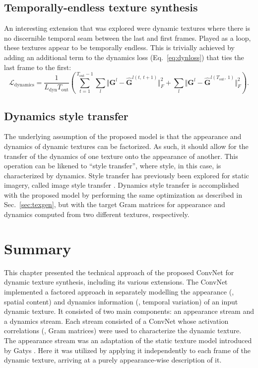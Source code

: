 {

\subsection{Temporally-endless texture synthesis}\label{sec:temporally_endless_synthesis}

An interesting extension that was explored were dynamic textures where there is no discernible temporal seam between the last and first frames. Played as a loop, these textures appear to be temporally endless. This is trivially achieved by adding an additional term to the dynamics loss (Eq.\ \ref{eq:dynloss}) that ties the last frame to the first:
\begin{equation}
	\mathcal{L}_\text{dynamics} = \frac{1}{L_\text{dyn} T_\text{out}}\left(\sum_{t=1}^{T_\text{out}-1} \sum_{l}  \Vert \mathbf{G}^l - \hat{\mathbf{G}}^{l(t,\ t+1)}\Vert^2_F + \sum_{l}  \Vert \mathbf{G}^l - \hat{\mathbf{G}}^{l(T_\text{out},\ 1)}\Vert^2_F\right).
\end{equation}

\subsection{Dynamics style transfer}

The underlying assumption of the proposed model is that the appearance
and dynamics of dynamic textures can be factorized.
As such, it should allow for the transfer of the dynamics of
one texture onto the appearance of another.
This operation can be likened to ``style transfer'', where style, in this case, is characterized by dynamics. Style transfer has previously been explored for static imagery, called image style transfer \cite{gatys2016image,champandard2016,gatys2017}.
Dynamics style transfer is accomplished with the proposed model by performing the same 
optimization as described in Sec.\ \ref{sec:texgen}, but with the target Gram matrices for 
appearance and dynamics computed from two different textures, respectively.

\section{Summary}

This chapter presented the technical approach of the proposed ConvNet for dynamic texture synthesis, including its various extensions. The ConvNet implemented a factored approach in separately modelling the appearance (\ie, spatial content) and dynamics information (\ie, temporal variation) of an input dynamic texture. It consisted of two main components: an appearance stream and a dynamics stream. Each stream consisted of a ConvNet whose activation correlations (\ie, Gram matrices) were used to characterize the dynamic texture. The appearance stream was an adaptation of the static texture model introduced by Gatys \etal \cite{gatys2015}. Here it was utilized by applying it independently to each frame of the dynamic texture, arriving at a purely appearance-wise description of it.

}
